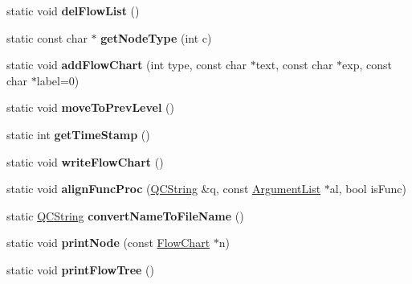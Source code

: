 \begin{DoxyCompactItemize}
\item 
\mbox{\label{class_flow_chart_a64f98636bae1290688ea4bc06d02e86f}} 
static void {\bfseries del\+Flow\+List} ()
\item 
\mbox{\label{class_flow_chart_a45109b9f0963e9c0b92a467e0ce63f12}} 
static const char $\ast$ {\bfseries get\+Node\+Type} (int c)
\item 
\mbox{\label{class_flow_chart_a2c9dfb37602a2a75ccb073f56154f969}} 
static void {\bfseries add\+Flow\+Chart} (int type, const char $\ast$text, const char $\ast$exp, const char $\ast$label=0)
\item 
\mbox{\label{class_flow_chart_a9ddf7f6aff23849c4bbb90afbabd38c1}} 
static void {\bfseries move\+To\+Prev\+Level} ()
\item 
\mbox{\label{class_flow_chart_a50ac682c2637e445a71ef5154f75747d}} 
static int {\bfseries get\+Time\+Stamp} ()
\item 
\mbox{\label{class_flow_chart_a66989e6892ad6bbb539241dedbfc4f9e}} 
static void {\bfseries write\+Flow\+Chart} ()
\item 
\mbox{\label{class_flow_chart_a3feb50e4c544d756e6b0b3edab073f41}} 
static void {\bfseries align\+Func\+Proc} (\mbox{\hyperlink{class_q_c_string}{Q\+C\+String}} \&q, const \mbox{\hyperlink{class_argument_list}{Argument\+List}} $\ast$al, bool is\+Func)
\item 
\mbox{\label{class_flow_chart_aaadfeca7904b4d69db2cda56d753d7a6}} 
static \mbox{\hyperlink{class_q_c_string}{Q\+C\+String}} {\bfseries convert\+Name\+To\+File\+Name} ()
\item 
\mbox{\label{class_flow_chart_a780c7678733b86fa3f47fb48b9d3bdc2}} 
static void {\bfseries print\+Node} (const \mbox{\hyperlink{class_flow_chart}{Flow\+Chart}} $\ast$n)
\item 
\mbox{\label{class_flow_chart_a25647e6b336425f3f5ccef2ecea0dcf1}} 
static void {\bfseries print\+Flow\+Tree} ()
\item 

\end{DoxyCompactItemize}

